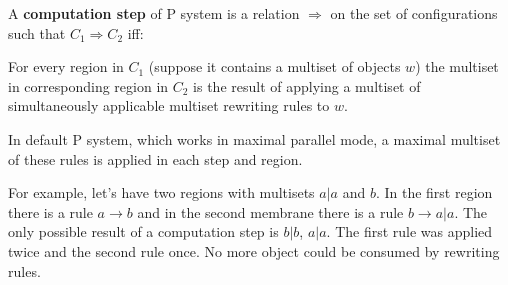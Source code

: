 A {\bf computation step} of P system is a relation $\Rightarrow$ on the set of configurations such that $C_1 \Rightarrow C_2$ iff:

For every region in $C_1$ (suppose it contains a multiset of objects $w$) the multiset in corresponding region in $C_2$ is the result of applying a multiset of simultaneously applicable multiset rewriting rules to $w$.

In default P system, which works in maximal parallel mode, a maximal multiset of these rules is applied in each step and region.

For example, let's have two regions with multisets $a|a$ and $b$. In the first region there is a rule $a\rightarrow b$ and in the second membrane there is a rule $b\rightarrow a|a$. The only possible result of a computation step is $b|b$, $a|a$. The first rule was applied twice and the second rule once. No more object could be consumed by rewriting rules.
